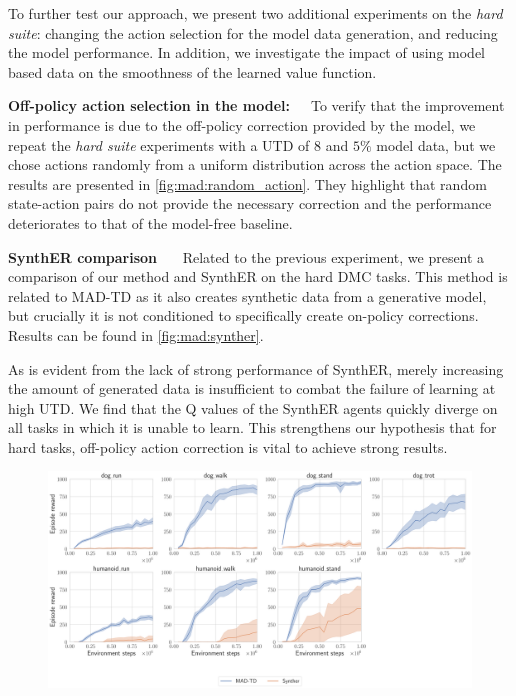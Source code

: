 To further test our approach, we present two additional experiments on the \emph{hard suite}: changing the action selection for the model data generation, and reducing the model performance.
In addition, we investigate the impact of using model based data on the smoothness of the learned value function.

\textbf{Off-policy action selection in the model:}~~~To verify that the  improvement in performance is due to the off-policy correction provided by the model, we repeat the \emph{hard suite} experiments with a UTD of $8$ and $5\%$ model data, but we chose actions randomly from a uniform distribution across the action space.
The results are presented in \autoref{fig:mad:random_action}.
They highlight that random state-action pairs do not provide the necessary correction and the performance deteriorates to that of the model-free baseline.

\textbf{SynthER comparison}~~~
Related to the previous experiment, we present a comparison of our method and SynthER on the hard DMC tasks.
This method is related to MAD-TD as it also creates synthetic data from a generative model, but crucially it is not conditioned to specifically create on-policy corrections.
Results can be found in \autoref{fig:mad:synther}.

As is evident from the lack of strong performance of SynthER, merely increasing the amount of generated data is insufficient to combat the failure of learning at high UTD.
We find that the Q values of the SynthER agents quickly diverge on all tasks in which it is unable to learn.
This strengthens our hypothesis that for hard tasks, off-policy action correction is vital to achieve strong results.

\begin{figure}[H]
    \centering
    \includegraphics[width=\linewidth]{figures/mad-td/hard_fs_1_synther.pdf}
    \caption{}
    \label{fig:mad:synther}
\end{figure}


